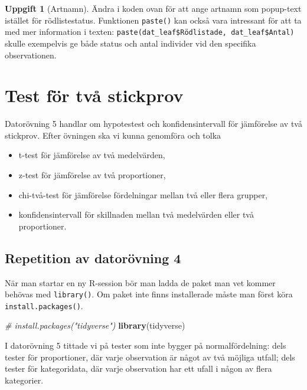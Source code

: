 \documentclass[
]{book}
\newenvironment{Shaded}{\begin{snugshade}}{\end{snugshade}}
\newcommand{\CommentTok}[1]{\textcolor[rgb]{0.56,0.35,0.01}{\textit{#1}}}
\newcommand{\FunctionTok}[1]{\textcolor[rgb]{0.13,0.29,0.53}{\textbf{#1}}}
\newcommand{\NormalTok}[1]{#1}
\theoremstyle{definition}
\theoremstyle{definition}
\theoremstyle{definition}
\newtheorem{exercise}{Uppgift}[chapter]
\theoremstyle{definition}
\theoremstyle{remark}
\begin{document}
\begin{exercise}[Artnamn]
Ändra i koden ovan för att ange artnamn som popup-text istället för rödlistestatus. Funktionen \texttt{paste()} kan också vara intressant för att ta med mer information i texten: \texttt{paste(dat\_leaf\$Rödlistade,\ dat\_leaf\$Antal)} skulle exempelvis ge både status och antal individer vid den specifika observationen.
\end{exercise}

\chapter{Test för två stickprov}\label{test-fuxf6r-tvuxe5-stickprov}

Datorövning 5 handlar om hypotestest och konfidensintervall för jämförelse av två stickprov. Efter övningen ska vi kunna genomföra och tolka

\begin{itemize}
\item
  t-test för jämförelse av två medelvärden,
\item
  z-test för jämförelse av två proportioner,
\item
  chi-två-test för jämförelse fördelningar mellan två eller flera grupper,
\item
  konfidensintervall för skillnaden mellan två medelvärden eller två proportioner.
\end{itemize}

\section{Repetition av datorövning 4}\label{repetition-av-datoruxf6vning-4}

När man startar en ny R-session bör man ladda de paket man vet kommer behövas med \texttt{library()}. Om paket inte finns installerade måste man först köra \texttt{install.packages()}.

\begin{Shaded}
\begin{Highlighting}[]
\CommentTok{\# install.packages("tidyverse")}
\FunctionTok{library}\NormalTok{(tidyverse)}
\end{Highlighting}
\end{Shaded}

I datorövning 5 tittade vi på tester som inte bygger på normalfördelning: dels tester för proportioner, där varje observation är något av två möjliga utfall; dels tester för kategoridata, där varje observation har ett ufall i någon av flera kategorier.
\end{document}
